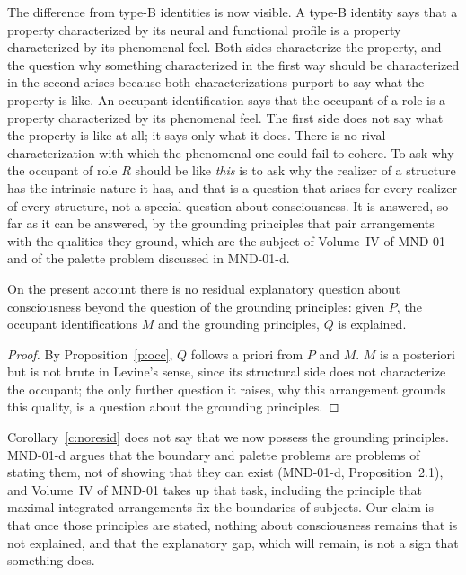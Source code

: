 \documentclass{situationist-preprint}
\begin{document}
The difference from type-B identities is now visible. A type-B identity says that a property characterized by its neural and functional profile is a property characterized by its phenomenal feel. Both sides characterize the property, and the question why something characterized in the first way should be characterized in the second arises because both characterizations purport to say what the property is like. An occupant identification says that the occupant of a role is a property characterized by its phenomenal feel. The first side does not say what the property is like at all; it says only what it does. There is no rival characterization with which the phenomenal one could fail to cohere. To ask why the occupant of role $R$ should be like \emph{this} is to ask why the realizer of a structure has the intrinsic nature it has, and that is a question that arises for every realizer of every structure, not a special question about consciousness. It is answered, so far as it can be answered, by the grounding principles that pair arrangements with the qualities they ground, which are the subject of Volume~IV of MND-01 and of the palette problem discussed in MND-01-d.

\begin{corollary}\label{c:noresid}
On the present account there is no residual explanatory question about consciousness beyond the question of the grounding principles: given $P$, the occupant identifications $M$ and the grounding principles, $Q$ is explained.
\end{corollary}

\begin{proof}
By Proposition~\ref{p:occ}, $Q$ follows a priori from $P$ and $M$. $M$ is a posteriori but is not brute in Levine's sense, since its structural side does not characterize the occupant; the only further question it raises, why this arrangement grounds this quality, is a question about the grounding principles.
\end{proof}

Corollary~\ref{c:noresid} does not say that we now possess the grounding principles. MND-01-d argues that the boundary and palette problems are problems of stating them, not of showing that they can exist (MND-01-d, Proposition~2.1), and Volume~IV of MND-01 takes up that task, including the principle that maximal integrated arrangements fix the boundaries of subjects. Our claim is that once those principles are stated, nothing about consciousness remains that is not explained, and that the explanatory gap, which will remain, is not a sign that something does.
\end{document}

